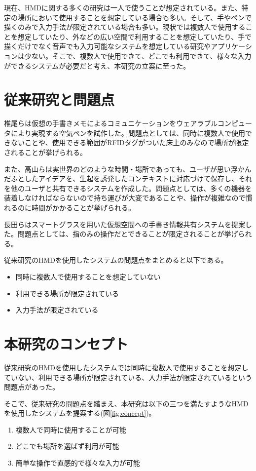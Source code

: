 \documentclass[technicalreport]{ieicej}
\begin{document}
現在、HMDに関する多くの研究は一人で使うことが想定されている。また、特定の場所において使用することを想定している場合も多い。そして、手やペンで描くのみで入力手法が限定されている場合も多い。現状では複数人で使用することを想定していたり、外などの広い空間で利用することを想定していたり、手で描くだけでなく音声でも入力可能なシステムを想定している研究やアプリケーションは少ない。そこで、複数人で使用できて、どこでも利用できて、様々な入力ができるシステムが必要だと考え、本研究の立案に至った。

\section{従来研究と問題点}
椎尾らは仮想の手書きメモによるコミュニケーションをウェアラブルコンピュータにより実現する空気ペンを試作した。問題点としては、同時に複数人で使用できないことや、使用できる範囲がRFIDタグがついた床上のみなので場所が限定されることが挙げられる。

また、高山らは実世界のどのような時間・場所であっても、ユーザが思い浮かんだふとしたアイデアを、生起を誘発したコンテキストに対応づけて保存し、それを他のユーザと共有できるシステムを作成した。問題点としては、多くの機器を装着しなければならないので持ち運びが大変であることや、操作が複雑なので慣れるのに時間がかかることが挙げられる。

長田らはスマートグラスを用いた仮想空間への手書き情報共有システムを提案した。問題点としては、指のみの操作だとできることが限定されることが挙げられる。

従来研究のHMDを使用したシステムの問題点をまとめると以下である。

\begin{itemize}
 \item 同時に複数人で使用することを想定していない
 \item 利用できる場所が限定されている
 \item 入力手法が限定されている
\end{itemize}

\section{本研究のコンセプト}
従来研究のHMDを使用したシステムでは同時に複数人で使用することを想定していない、利用できる場所が限定されている、入力手法が限定されているという問題点があった。

そこで、従来研究の問題点を踏まえ、本研究は以下の三つを満たすようなHMDを使用したシステムを提案する(図\ref{fig:concept})。

\begin{enumerate}
 \item 複数人で同時に使用することが可能
 \item どこでも場所を選ばず利用が可能
 \item 簡単な操作で直感的で様々な入力が可能
\end{enumerate}
\end{document}
